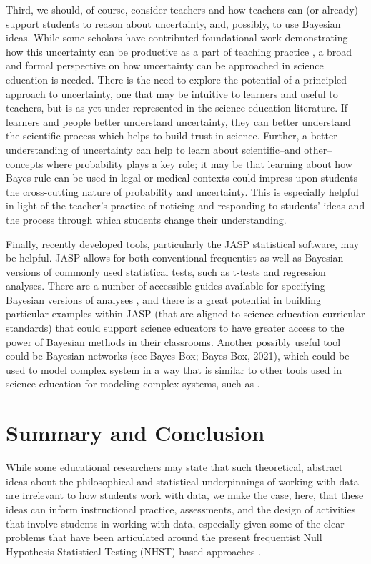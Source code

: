 \documentclass[man]{apa7}
\begin{document}
Third, we should, of course, consider teachers and how teachers can (or already) support students to reason about uncertainty, and, possibly, to use Bayesian ideas. While some scholars have contributed foundational work demonstrating how this uncertainty can be productive as a part of teaching practice \parencite{manz2018supporting}, a broad and formal perspective on how uncertainty can be approached in science education is needed. There is the need to explore the potential of a principled approach to uncertainty, one that may be intuitive to learners and useful to teachers, but is as yet under-represented in the science education literature. If learners and people better understand uncertainty, they can better understand the scientific process which helps to build trust in science. Further, a better understanding of uncertainty can help to learn about scientific--and other--concepts where probability plays a key role; it may be that learning about how Bayes rule can be used in legal or medical contexts could impress upon students the cross-cutting nature of probability and uncertainty. This is especially helpful in light of the teacher's practice of noticing and responding to students' ideas and the process through which students change their understanding.

Finally, recently developed tools, particularly the JASP statistical software, may be helpful. JASP allows for both conventional frequentist as well as Bayesian versions of commonly used statistical tests, such as t-tests and regression analyses. There are a number of accessible guides available for specifying Bayesian versions of analyses \parencite{v20, wagenmakers2018bayesian}, and there is a great potential in building particular examples within JASP (that are aligned to science education curricular standards) that could support science educators to have greater access to the power of Bayesian methods in their classrooms. Another possibly useful tool could be Bayesian networks (see Bayes Box; Bayes Box, 2021), which could be used to model complex system in a way that is similar to other tools used in science education for modeling complex systems, such as \textcite{20}.

\section{Summary and Conclusion}

While some educational researchers may state that such theoretical, abstract ideas about the philosophical and statistical underpinnings of working with data are irrelevant to how students work with data, we make the case, here, that these ideas can inform instructional practice, assessments, and the design of activities that involve students in working with data, especially given some of the clear problems that have been articulated around the present frequentist Null Hypothesis Statistical Testing (NHST)-based approaches \parencite{c14, gkv04}.
\end{document}
